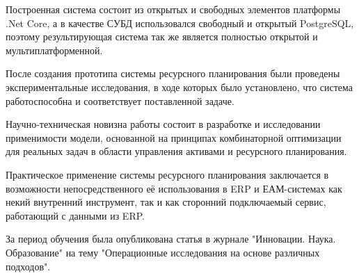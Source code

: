 Построенная система состоит из открытых и свободных элементов платформы .Net Core, а в качестве СУБД использовался свободный и открытый PostgreSQL, поэтому результирующая система так же является полностью открытой и мультиплатформенной.

После создания прототипа системы ресурсного планирования были проведены экспериментальные исследования, в ходе которых было установлено, что система работоспособна и соответствует поставленной задаче.

Научно-техническая новизна работы состоит в разработке и исследовании применимости модели, основанной на принципах комбинаторной оптимизации для реальных задач в области управления активами и ресурсного планирования.

Практическое применение системы ресурсного планирования заключается в возможности непосредственного её использования в ERP и ЕАМ-системах как некий внутренний инструмент, так и как сторонний подключаемый сервис, работающий с данными из ERP.

За период обучения была опубликована статья в журнале "Инновации. Наука. Образование" на тему "Операционные исследования на основе различных подходов".


\clearpage
